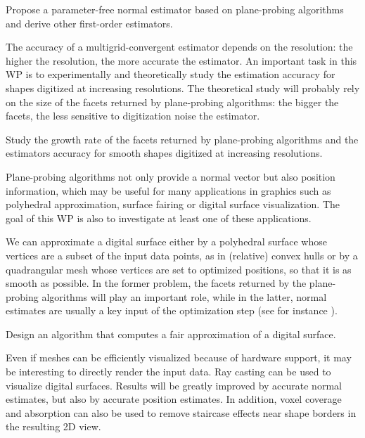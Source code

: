 \begin{Task}
  \label{task:normal}
  Propose a parameter-free normal estimator based on plane-probing algorithms and
  derive other first-order estimators.  
\end{Task}

The accuracy of a multigrid-convergent estimator depends on the resolution: the higher the resolution,
the more accurate the estimator. An important task in this WP is to experimentally and theoretically
study the estimation accuracy for shapes digitized at increasing resolutions. The theoretical study
will probably rely on the size of the facets returned by plane-probing algorithms: the bigger the facets,
the less sensitive to digitization noise the estimator. 

\begin{Task}
  \label{task:conv}
  Study the growth rate of the facets returned by plane-probing algorithms
  and the estimators accuracy for smooth shapes digitized at increasing resolutions. 
\end{Task}

Plane-probing algorithms not only provide a normal vector but also position information,
which may be useful for many applications in graphics such as polyhedral approximation,
surface fairing or digital surface visualization. The goal of this WP is also to investigate
at least one of these applications.   

We can approximate a digital surface either by a polyhedral surface whose vertices 
are a subset of the input data points, as in (relative) convex hulls 
\cite{Klette2001,Schultz2009} 
or by a quadrangular mesh whose vertices are set to optimized positions, so that it is
as smooth as possible. In the former problem, the facets returned by the
plane-probing algorithms will play an important role, while in the latter,
normal estimates are usually a key input of the optimization step (see for instance
\cite{Coeurjolly2017}).  

\begin{Task}
  \label{task:approx}
  Design an algorithm that computes a fair approximation of a digital surface. 
\end{Task}

Even if meshes can be efficiently visualized because of hardware support,
it may be interesting to directly render the input data. Ray casting can be used to
visualize digital surfaces. Results will be greatly improved by accurate normal estimates,
but also by accurate position estimates. In addition, voxel coverage and absorption can
also be used to remove staircase effects near shape borders in the resulting 2D view.

